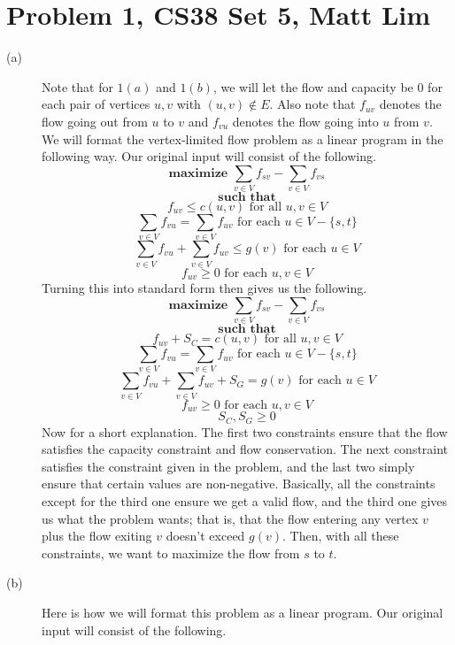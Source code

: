 \documentclass{article}
\begin{document}
\section*{Problem 1, CS38 Set 5, Matt Lim}
\begin{description}
    \item[(a)]
        Note that for $1(a)$ and $1(b)$, we will let the flow and capacity be 0
        for each pair of vertices $u,v$ with $(u,v) \notin E$. Also note that
        $f_{uv}$ denotes the flow going out from $u$ to $v$ and $f_{vu}$ denotes
        the flow going into $u$ from $v$.
        We will format the vertex-limited flow problem as a linear program in
        the following way. Our original input will consist of the following.
        \[ \textbf{maximize } \sum_{v \in V} f_{sv} - \sum_{v \in V} f_{vs} \]
        \[ \textbf{such that} \]
        \[ f_{uv} \leq c(u,v) \text{ for all $u,v \in V$} \]
        \[ \sum_{v \in V} f_{vu} = \sum_{v \in V} f_{uv} \text{ for each $u \in
        V - \{s,t\}$} \]
        \[ \sum_{v \in V} f_{vu} + \sum_{v \in V} f_{uv} \leq g(v) \text{ for each $u \in
        V$} \]
        \[ f_{uv} \ge 0 \text{ for each $u,v \in V$} \]
        Turning this into standard form then gives us the following.
        \[ \textbf{maximize } \sum_{v \in V} f_{sv} - \sum_{v \in V} f_{vs} \]
        \[ \textbf{such that} \]
        \[ f_{uv} + S_C = c(u,v) \text{ for all $u,v \in V$} \]
        \[ \sum_{v \in V} f_{vu} = \sum_{v \in V} f_{uv} \text{ for each $u \in
        V - \{s,t\}$} \]
        \[ \sum_{v \in V} f_{vu} + \sum_{v \in V} f_{uv} + S_G = g(v) \text{ for each $u \in
        V$} \]
        \[ f_{uv} \ge 0 \text{ for each $u,v \in V$} \]
        \[ S_C, S_G \ge 0 \]
        Now for a short explanation. The first two constraints ensure that the
        flow satisfies the capacity constraint and flow conservation. The next
        constraint satisfies the constraint given in the problem, and the last
        two simply ensure that certain values are non-negative. Basically, all
        the constraints except for the third one ensure we get a valid flow, and
        the third one gives us what the problem wants; that is, that the flow
        entering any vertex $v$ plus the flow exiting $v$ doesn't exceed
        $g(v)$. Then, with all
        these constraints, we want to maximize the flow from $s$ to $t$.
    \item[(b)]
        Here is how we will format this problem as a linear program. Our
        original input will consist of the following.

\end{description}
\end{document}
